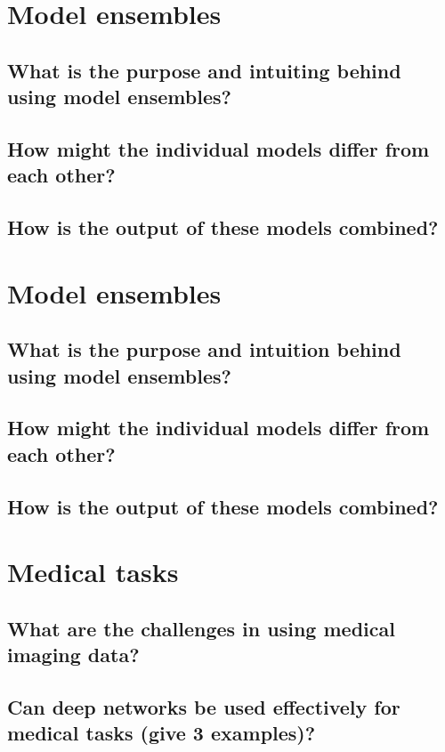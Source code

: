 \section{Model ensembles}

\subsection{What is the purpose and intuiting behind using model ensembles?}

\subsection{How might the individual models differ from each other?}

\subsection{How is the output of these models combined?}

\section{Model ensembles}

\subsection{What is the purpose and intuition behind using model ensembles?}

\subsection{How might the individual models differ from each other?}

\subsection{How is the output of these models combined?}

\section{Medical tasks}

\subsection{What are the challenges in using medical imaging data?}

\subsection{Can deep networks be used effectively for medical tasks (give 3 examples)?}

